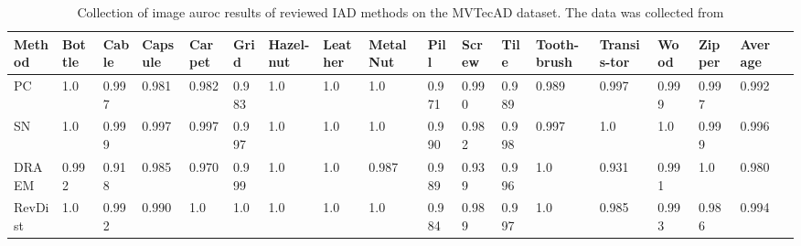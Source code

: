 \begin{table}[htbp]
    \tiny
    \centering
    \begin{tabularx}{\textwidth}{|X|X|X|X|X|X|X|X|X|X|X|X|X|X|X|X|X|X|}%
        \hline
        \textbf{Method} & \textbf{Bottle} & \textbf{Cable} & \textbf{Capsule} & \textbf{Carpet} & \textbf{Grid} & \textbf{Hazel-nut} & \textbf{Leather} & \textbf{Metal Nut} & \textbf{Pill} & \textbf{Screw} & \textbf{Tile} & \textbf{Tooth-brush} & \textbf{Transis-tor} & \textbf{Wood} & \textbf{Zipper} & \textbf{Average} \\
        \hline
        PC \cite{patchCore2022} & 1.0 & 0.997 & 0.981 & 0.982 & 0.983 & 1.0 & 1.0 & 1.0 & 0.971 & 0.990 & 0.989 & 0.989 & 0.997 & 0.999 & 0.997 & 0.992 \\
        \hline
        SN \cite{liu2023simplenet} & 1.0 & 0.999 & 0.997 & 0.997 & 0.997 & 1.0 & 1.0 & 1.0 & 0.990 & 0.982 & 0.998 & 0.997 & 1.0 & 1.0 & 0.999 & 0.996 \\
       \hline
        DRAEM \cite{Zavrtanik_2021DRAEM} & 0.992 & 0.918 & 0.985 & 0.970 & 0.999 & 1.0 & 1.0 & 0.987 & 0.989 & 0.939 & 0.996 & 1.0 & 0.931 & 0.991 & 1.0 & 0.980 \\
        \hline
        RevDist \cite{revdist2023} & 1.0 & 0.992 & 0.990 & 1.0 & 1.0 & 1.0 & 1.0 & 1.0 & 0.984 & 0.989 & 0.997 & 1.0 & 0.985 & 0.993 & 0.986 & 0.994 \\
        \hline
    \end{tabularx}
    \caption{Collection of image auroc results of reviewed IAD methods on the MVTecAD \cite{MVTEC_Bergmann_2021} dataset. The data was collected from \cite{liu2024deep} \cite{liu2023simplenet} \cite{Zavrtanik_2021DRAEM} \cite{revdist2023}}
    \label{tab:imageaurocmvtec}
\end{table}

